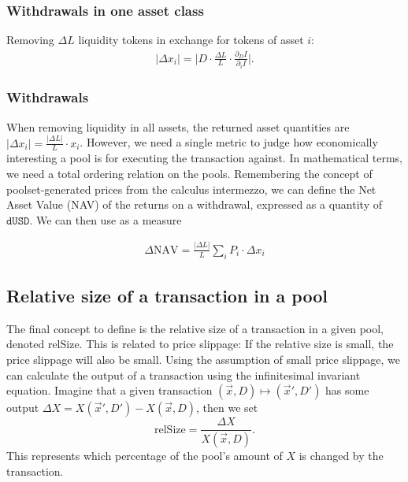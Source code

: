 \documentclass[12pt]{article}
\begin{document}
\subsubsection{Withdrawals in one asset class}

Removing $\Delta L$ liquidity tokens in exchange for tokens of asset $i$:
\begin{equation*}
  \begin{split}
    |\Delta x_i|
    = \Big| D \cdot \frac{\Delta L}{L} \cdot \frac{\partial_D I}{\partial_i I} \Big|.
  \end{split}
\end{equation*}

\subsubsection{Withdrawals}

When removing liquidity in all assets, the returned asset quantities are
$|\Delta x_i| = \frac{|\Delta L|}{L} \cdot x_i$.
However, we need a single metric to judge how economically interesting a pool is
for executing the transaction against.
In mathematical terms, we need a total ordering relation on the pools.
Remembering the concept of poolset-generated prices from the calculus
intermezzo, we can define the Net Asset Value (NAV) of the returns on a
withdrawal, expressed as a quantity of $\texttt{dUSD}$.
We can then use as a measure

\begin{equation*}
  \begin{split}
    \Delta \text{NAV}
    = \frac{|\Delta L|}{L} \sum_i P_i \cdot \Delta x_i
  \end{split}
\end{equation*}

\subsection{Relative size of a transaction in a pool}

The final concept to define is the relative size of a transaction in a given
pool, denoted relSize.
This is related to price slippage:
If the relative size is small, the price slippage will also be small.
Using the assumption of small price slippage, we can calculate the output of a
transaction using the infinitesimal invariant equation.
Imagine that a given transaction $(\vec{x}, D) \mapsto (\vec{x}', D')$ has some
output $\Delta X = X(\vec{x}', D') - X(\vec{x}, D)$, then we set
$$ \text{relSize} = \frac{\Delta X}{X(\vec{x}, D)}. $$
This represents which percentage of the pool's amount of $X$ is changed by the
transaction.
\end{document}
